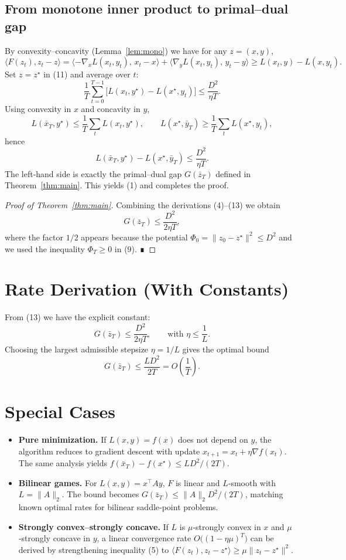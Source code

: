 \documentclass{article}
\newcommand{\grad}{\nabla}
\begin{document}
\subsection*{From monotone inner product to primal–dual gap}
By convexity–concavity (Lemma~\ref{lem:mono}) we have for any $z=(x,y)$,
\[
\langle F(z_{t}),z_{t}-z\rangle
= \langle -\grad_{x}L(x_{t},y_{t}),\,x_{t}-x\rangle
   +\langle \grad_{y}L(x_{t},y_{t}),\,y_{t}-y\rangle
\ge L(x_{t},y)-L(x,y_{t}). \tag{11}
\]
Set $z=z^{\star}$ in (11) and average over $t$:
\[
\frac{1}{T}\sum_{t=0}^{T-1}\bigl[L(x_{t},y^{\star})-L(x^{\star},y_{t})\bigr]
\le \frac{D^{2}}{\eta T}. \tag{12}
\]
Using convexity in $x$ and concavity in $y$,
\[
L(\bar x_{T},y^{\star})\le\frac{1}{T}\sum_{t}L(x_{t},y^{\star}),\qquad
L(x^{\star},\bar y_{T})\ge\frac{1}{T}\sum_{t}L(x^{\star},y_{t}),
\]
hence
\[
L(\bar x_{T},y^{\star})-L(x^{\star},\bar y_{T})
\le \frac{D^{2}}{\eta T}. \tag{13}
\]
The left‑hand side is exactly the primal–dual gap $G(\bar z_{T})$ defined in Theorem~\ref{thm:main}. This yields (1) and completes the proof.

\begin{proof}[Proof of Theorem~\ref{thm:main}]
Combining the derivations (4)–(13) we obtain
\[
G(\bar z_{T})\le\frac{D^{2}}{2\eta T},
\]
where the factor $1/2$ appears because the potential $\Phi_{0}= \|z_{0}-z^{\star}\|^{2}\le D^{2}$ and we used the inequality $\Phi_{T}\ge0$ in (9). ∎
\end{proof}

\section*{Rate Derivation (With Constants)}
From (13) we have the explicit constant:
\[
G(\bar z_{T})\le \frac{D^{2}}{2\eta T},\qquad\text{with }\eta\le\frac{1}{L}.
\]
Choosing the largest admissible stepsize $\eta=1/L$ gives the optimal bound
\[
G(\bar z_{T})\le \frac{L D^{2}}{2T}=O\!\left(\frac{1}{T}\right).
\]

\section*{Special Cases}
\begin{itemize}
\item \textbf{Pure minimization.} If $L(x,y)=f(x)$ does not depend on $y$, the algorithm reduces to gradient descent with update $x_{t+1}=x_{t}+\eta\grad f(x_{t})$. The same analysis yields $f(\bar x_{T})-f(x^{\star})\le LD^{2}/(2T)$.
\item \textbf{Bilinear games.} For $L(x,y)=x^{\top}Ay$, $F$ is linear and $L$‑smooth with $L=\|A\|_{2}$. The bound becomes $G(\bar z_{T})\le \|A\|_{2}D^{2}/(2T)$, matching known optimal rates for bilinear saddle‑point problems.
\item \textbf{Strongly convex–strongly concave.} If $L$ is $\mu$‑strongly convex in $x$ and $\mu$‑strongly concave in $y$, a linear convergence rate $O\bigl((1-\eta\mu)^{T}\bigr)$ can be derived by strengthening inequality (5) to $\langle F(z_{t}),z_{t}-z^{\star}\rangle\ge\mu\|z_{t}-z^{\star}\|^{2}$.
\end{itemize}
\end{document}
